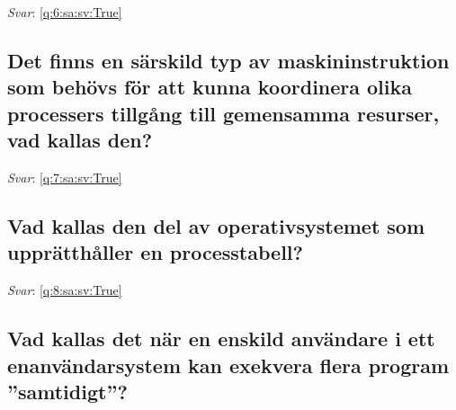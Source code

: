 \documentclass[a4paper,11pt,oneside]{article}
\begin{document}
\begin{sloppypar}
\vspace{2cm}

\noindent\makebox[\textwidth]{\hrulefill}

\vspace{1cm}

\textit{Svar}: \autoref{q:6:sa:sv:True}



\subsection{Det finns en s\"arskild typ av maskininstruktion som beh\"ovs f\"or att kunna koordinera olika processers tillg\r{a}ng till gemensamma resurser, vad kallas den?}

\label{q:7:sa:sv:False}

\vspace{2cm}

\noindent\makebox[\textwidth]{\hrulefill}

\vspace{1cm}

\textit{Svar}: \autoref{q:7:sa:sv:True}



\subsection{Vad kallas den del av operativsystemet som uppr\"atth\r{a}ller en processtabell?}

\label{q:8:sa:sv:False}

\vspace{2cm}

\noindent\makebox[\textwidth]{\hrulefill}

\vspace{1cm}

\textit{Svar}: \autoref{q:8:sa:sv:True}



\subsection{Vad kallas det n\"ar en enskild anv\"andare i ett enanv\"andarsystem kan exekvera flera program {\textquotedblright}samtidigt{\textquotedblright}?}

\label{q:10:sa:sv:False}

\vspace{2cm}

\noindent\makebox[\textwidth]{\hrulefill}

\vspace{1cm}


\end{sloppypar}
\end{document}
